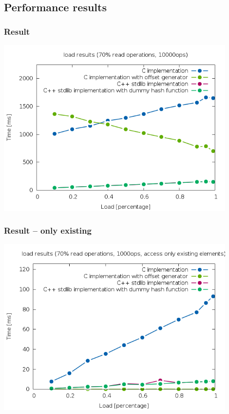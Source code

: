 \documentclass{beamer}
\begin{document}
\subsection{Performance results}
\begin{frame}
	\frametitle{Result}
	\begin{center}
		\includegraphics[width=0.9\textwidth]{result_example_contains.png}	
	\end{center}
\end{frame}

\begin{frame}
	\frametitle{Result -- only existing}
	\begin{center}
		\includegraphics[width=0.9\textwidth]{result_example_no_contains.png}	
	\end{center}
\end{frame}
\end{document}
